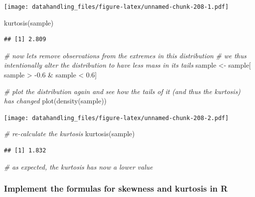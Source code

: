 \documentclass[
  12pt,
]{style/krantz}
\newenvironment{Shaded}{\begin{snugshade}}{\end{snugshade}}
\newcommand{\CommentTok}[1]{\textcolor[rgb]{0.56,0.35,0.01}{\textit{#1}}}
\newcommand{\FloatTok}[1]{\textcolor[rgb]{0.00,0.00,0.81}{#1}}
\newcommand{\FunctionTok}[1]{\textcolor[rgb]{0.00,0.00,0.00}{#1}}
\newcommand{\NormalTok}[1]{#1}
\newcommand{\OtherTok}[1]{\textcolor[rgb]{0.56,0.35,0.01}{#1}}
\newcommand{\SpecialCharTok}[1]{\textcolor[rgb]{0.00,0.00,0.00}{#1}}
\begin{document}
\texttt{[image: datahandling\_files/figure-latex/unnamed-chunk-208-1.pdf]}

\begin{Shaded}
\begin{Highlighting}[]
\FunctionTok{kurtosis}\NormalTok{(sample)}
\end{Highlighting}
\end{Shaded}

\begin{verbatim}
## [1] 2.809
\end{verbatim}

\begin{Shaded}
\begin{Highlighting}[]
\CommentTok{\# now lets remove observations from the extremes in this distribution}
\CommentTok{\# we thus intentionally alter the distribution to have less mass in its tails}
\NormalTok{sample }\OtherTok{\textless{}{-}}\NormalTok{ sample[ sample }\SpecialCharTok{\textgreater{}} \SpecialCharTok{{-}}\FloatTok{0.6} \SpecialCharTok{\&}\NormalTok{ sample }\SpecialCharTok{\textless{}} \FloatTok{0.6}\NormalTok{]}

\CommentTok{\# plot the distribution again and see how the tails of it (and thus the kurtosis) has changed}
\FunctionTok{plot}\NormalTok{(}\FunctionTok{density}\NormalTok{(sample))}
\end{Highlighting}
\end{Shaded}

\texttt{[image: datahandling\_files/figure-latex/unnamed-chunk-208-2.pdf]}

\begin{Shaded}
\begin{Highlighting}[]
\CommentTok{\# re{-}calculate the kurtosis}
\FunctionTok{kurtosis}\NormalTok{(sample)}
\end{Highlighting}
\end{Shaded}

\begin{verbatim}
## [1] 1.832
\end{verbatim}

\begin{Shaded}
\begin{Highlighting}[]
\CommentTok{\# as expected, the kurtosis has now a lower value}
\end{Highlighting}
\end{Shaded}

\hypertarget{implement-the-formulas-for-skewness-and-kurtosis-in-r}{%
\subsubsection{Implement the formulas for skewness and kurtosis in R}\label{implement-the-formulas-for-skewness-and-kurtosis-in-r}}
\end{document}
